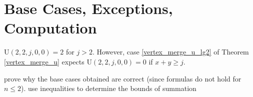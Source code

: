 \documentclass[a4paper, 12pt] {article}
\theoremstyle{remark}
\theoremstyle{plain}
\theoremstyle{remark}
\begin{document}
\section{Base Cases, Exceptions, Computation}
\label{base_cases_exceptions}


$\mathrm{U}(2,2,j,0,0)=2$ for $j>2$. However, case \ref{vertex_merge_u_lg2} of Theorem \ref{vertex_merge_u} expects $\mathrm{U}(2,2,j,0,0)=0$ if $x+y \geq j$. 



prove why the base cases obtained are correct (since formulas do not hold for $n \leq 2$).
use inequalities to determine the bounds of summation
\end{document}
